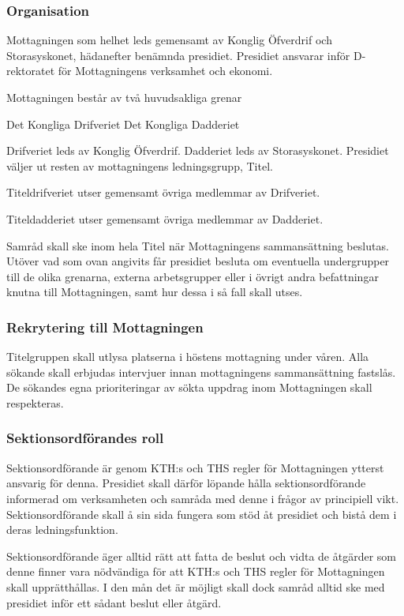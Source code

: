 \documentclass{dgovdoc}
\begin{document}
\subsubsection{Organisation}

Mottagningen som helhet leds gemensamt av Konglig Öfverdrif och Storasyskonet, hädanefter benämnda presidiet. Presidiet ansvarar inför D-rektoratet för Mottagningens verksamhet och ekonomi.

Mottagningen består av två huvudsakliga grenar

Det Kongliga Drifveriet
Det Kongliga Dadderiet

Drifveriet leds av Konglig Öfverdrif. Dadderiet leds av Storasyskonet. Presidiet väljer ut resten av mottagningens ledningsgrupp, Titel.

Titeldrifveriet utser gemensamt övriga medlemmar av Drifveriet.

Titeldadderiet utser gemensamt övriga medlemmar av Dadderiet.

Samråd skall ske inom hela Titel när Mottagningens sammansättning beslutas. Utöver vad som ovan angivits får presidiet besluta om eventuella undergrupper till de olika grenarna, externa arbetsgrupper eller i övrigt andra befattningar knutna till Mottagningen, samt hur dessa i så fall skall utses.

\subsubsection{Rekrytering till Mottagningen}

Titelgruppen skall utlysa platserna i höstens mottagning under våren. Alla sökande skall erbjudas intervjuer innan mottagningens sammansättning fastslås. De sökandes egna prioriteringar av sökta uppdrag inom Mottagningen skall respekteras.

\subsubsection{Sektionsordförandes roll}

Sektionsordförande är genom KTH:s och THS regler för Mottagningen ytterst ansvarig för denna. Presidiet skall därför löpande hålla sektionsordförande informerad om verksamheten och samråda med denne i frågor av principiell vikt. Sektionsordförande skall å sin sida fungera som stöd åt presidiet och bistå dem i deras ledningsfunktion.

Sektionsordförande äger alltid rätt att fatta de beslut och vidta de åtgärder som denne finner vara nödvändiga för att KTH:s och THS regler för Mottagningen skall upprätthållas. I den mån det är möjligt skall dock samråd alltid ske med presidiet inför ett sådant beslut eller åtgärd.
\end{document}
